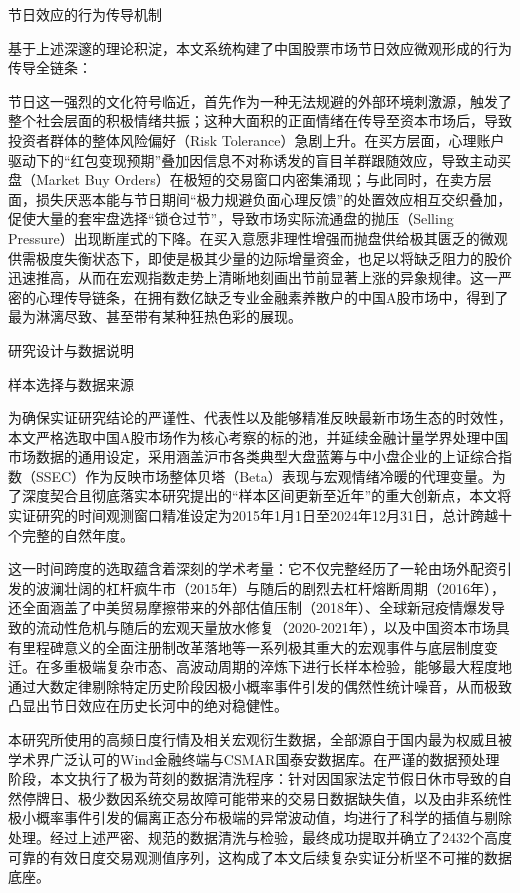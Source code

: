 \documentclass{cupb-thesis}
\begin{document}
节日效应的行为传导机制

基于上述深邃的理论积淀，本文系统构建了中国股票市场节日效应微观形成的行为传导全链条：

节日这一强烈的文化符号临近，首先作为一种无法规避的外部环境刺激源，触发了整个社会层面的积极情绪共振；这种大面积的正面情绪在传导至资本市场后，导致投资者群体的整体风险偏好（Risk Tolerance）急剧上升。在买方层面，心理账户驱动下的“红包变现预期”叠加因信息不对称诱发的盲目羊群跟随效应，导致主动买盘（Market Buy Orders）在极短的交易窗口内密集涌现；与此同时，在卖方层面，损失厌恶本能与节日期间“极力规避负面心理反馈”的处置效应相互交织叠加，促使大量的套牢盘选择“锁仓过节”，导致市场实际流通盘的抛压（Selling Pressure）出现断崖式的下降。在买入意愿非理性增强而抛盘供给极其匮乏的微观供需极度失衡状态下，即使是极其少量的边际增量资金，也足以将缺乏阻力的股价迅速推高，从而在宏观指数走势上清晰地刻画出节前显著上涨的异象规律。这一严密的心理传导链条，在拥有数亿缺乏专业金融素养散户的中国A股市场中，得到了最为淋漓尽致、甚至带有某种狂热色彩的展现。


研究设计与数据说明

样本选择与数据来源

为确保实证研究结论的严谨性、代表性以及能够精准反映最新市场生态的时效性，本文严格选取中国A股市场作为核心考察的标的池，并延续金融计量学界处理中国市场数据的通用设定，采用涵盖沪市各类典型大盘蓝筹与中小盘企业的上证综合指数（SSEC）作为反映市场整体贝塔（Beta）表现与宏观情绪冷暖的代理变量。为了深度契合且彻底落实本研究提出的“样本区间更新至近年”的重大创新点，本文将实证研究的时间观测窗口精准设定为2015年1月1日至2024年12月31日，总计跨越十个完整的自然年度。


这一时间跨度的选取蕴含着深刻的学术考量：它不仅完整经历了一轮由场外配资引发的波澜壮阔的杠杆疯牛市（2015年）与随后的剧烈去杠杆熔断周期（2016年），还全面涵盖了中美贸易摩擦带来的外部估值压制（2018年）、全球新冠疫情爆发导致的流动性危机与随后的宏观天量放水修复（2020-2021年），以及中国资本市场具有里程碑意义的全面注册制改革落地等一系列极其重大的宏观事件与底层制度变迁。在多重极端复杂市态、高波动周期的淬炼下进行长样本检验，能够最大程度地通过大数定律剔除特定历史阶段因极小概率事件引发的偶然性统计噪音，从而极致凸显出节日效应在历史长河中的绝对稳健性。


本研究所使用的高频日度行情及相关宏观衍生数据，全部源自于国内最为权威且被学术界广泛认可的Wind金融终端与CSMAR国泰安数据库。在严谨的数据预处理阶段，本文执行了极为苛刻的数据清洗程序：针对因国家法定节假日休市导致的自然停牌日、极少数因系统交易故障可能带来的交易日数据缺失值，以及由非系统性极小概率事件引发的偏离正态分布极端的异常波动值，均进行了科学的插值与剔除处理。经过上述严密、规范的数据清洗与检验，最终成功提取并确立了2432个高度可靠的有效日度交易观测值序列，这构成了本文后续复杂实证分析坚不可摧的数据底座。
\end{document}
